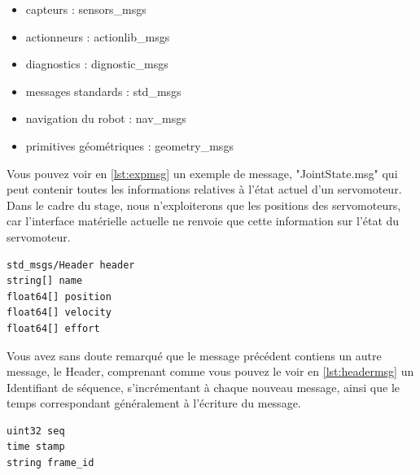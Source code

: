 \documentclass{tnreport}
\begin{document}
\begin{itemize}
    \item capteurs : sensors\_msgs
    \item actionneurs : actionlib\_msgs
    \item diagnostics : dignostic\_msgs
    \item messages standards : std\_msgs
    \item navigation du robot : nav\_msgs
    \item primitives géométriques : geometry\_msgs
\end{itemize}

Vous pouvez voir en \ref{lst:expmsg} un exemple de message, "JointState.msg" qui peut contenir toutes les informations relatives à l'état actuel d'un \gls{servomoteur}. Dans le cadre du stage, nous n'exploiterons que les positions des \gls{servomoteur}s, car l'interface matérielle actuelle ne renvoie que cette information sur l'état du \gls{servomoteur}.  
\begin{lstlisting}[caption={Contenu du JointState.msg}, label={lst:expmsg}]
std_msgs/Header header
string[] name
float64[] position
float64[] velocity
float64[] effort
\end{lstlisting}

Vous avez sans doute remarqué que le message précédent contiens un autre message, le Header, comprenant comme vous pouvez le voir en \ref{lst:headermsg} un Identifiant de séquence, s'incrémentant à chaque nouveau message, ainsi que le temps correspondant généralement à l'écriture du message. 

\begin{lstlisting}[caption={En-tête d'un message}, label={lst:headermsg}]
uint32 seq
time stamp
string frame_id
\end{lstlisting}
\end{document}
